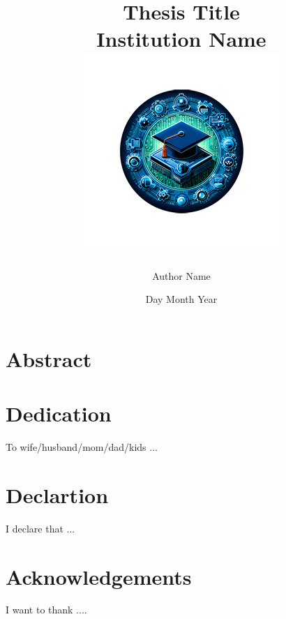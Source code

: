 \documentclass[12pt]{report}
\title{
	{Thesis Title}\\
	{\large Institution Name}\\
	{\includegraphics{university.png}}
}
\author{Author Name}
\date{Day Month Year}
\begin{document}
	
\maketitle

\chapter*{Abstract}	
\lipsum[1]


\chapter*{Dedication}
To wife/husband/mom/dad/kids ...

\chapter*{Declartion}
I declare that ...

\chapter*{Acknowledgements}
I want to thank .... 

\tableofcontents





%
%





	
\end{document}
